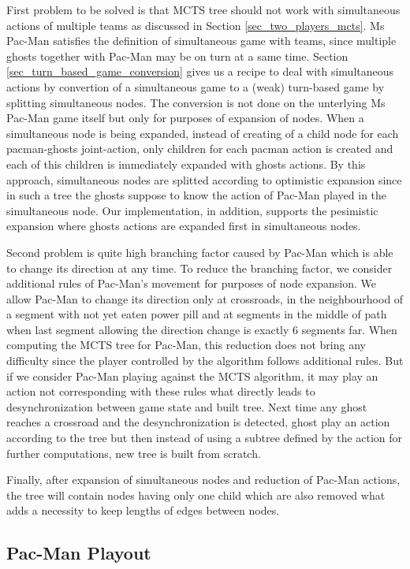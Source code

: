 First problem to be solved is that MCTS tree should not work with simultaneous actions of
multiple teams as discussed in Section \ref{sec_two_players_mcts}. 
Ms Pac-Man satisfies the definition of simultaneous game with teams, since multiple ghosts
together with Pac-Man may be on turn at a same time.
Section 
\ref{sec_turn_based_game_conversion} gives us a recipe to deal with simultaneous actions by
convertion of a simultaneous game to a (weak) turn-based game by splitting simultaneous nodes. The
conversion is not done on the unterlying Ms Pac-Man game itself but only for purposes of
expansion of nodes. When a simultaneous node is being expanded, instead of creating of a child
node for each pacman-ghosts joint-action, only children for each pacman action is created and
each of this children is immediately expanded with ghosts actions. By this approach,
simultaneous nodes are splitted according to optimistic expansion since in such a tree the
ghosts suppose to know the action of Pac-Man played in the simultaneous node. Our
implementation, in addition, supports the pesimistic expansion where ghosts actions are
expanded first in simultaneous nodes.

Second problem is quite high branching factor caused by Pac-Man which is able to change its
direction at any time. To reduce the branching factor, we consider additional rules of Pac-Man's
movement for purposes of node expansion. We allow Pac-Man to change its direction only at
crossroads, in the neighbourhood of a segment with not yet eaten power pill and at segments in
the middle of path when last segment allowing the direction change is exactly 6 segments far.
When computing the MCTS tree for Pac-Man, this reduction does not bring any difficulty since
the player controlled by the algorithm follows additional rules. But if we consider Pac-Man
playing against the MCTS algorithm, it may play an action not corresponding with these rules what
directly leads to desynchronization between game state and built tree. Next time any ghost
reaches  a crossroad and the desynchronization is detected, ghost play an action according to
the tree but then instead of using a subtree defined by the action for further computations,
new tree is built from scratch.

Finally, after expansion of simultaneous nodes and reduction of Pac-Man actions, the tree
will contain nodes having only one child which are also removed what adds a necessity to keep
lengths of edges between nodes.


\subsection{Pac-Man Playout}
\label{sec_impl_playout}

